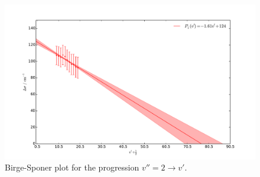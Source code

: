 \begin{figure}
    \centering
    \includegraphics[width=\pltw]{analysis/figures/b_s_2.pdf}
    \caption{Birge-Sponer plot for the progression $v'' = 2 \rightarrow v'$.  
    }
    \label{fig:b_s_2}
\end{figure}

